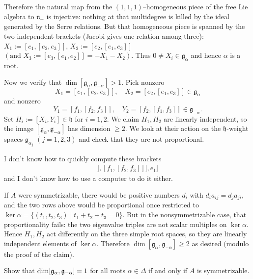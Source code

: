 \documentclass[12pt]{article}
\begin{document}
\begin{solution}[Incomplete]
    Therefore the natural map from the $(1,1,1)$–homogeneous piece of the free Lie algebra to $\mathfrak{n}_+$ is injective: nothing at that multidegree is killed by the ideal generated by the Serre relations. But that homogeneous piece is spanned by the two independent brackets (Jacobi gives one relation among three):
    $X_1:=[e_1,[e_2,e_3]]$, $X_2:=[e_2,[e_1,e_3]]$ $(\text{and }X_3:=[e_3,[e_1,e_2]]=-X_1-X_2)$. Thus $0\neq X_i\in \mathfrak{g}_{\alpha}$ and hence $\alpha$ is a root.


    Now we verify that $\dim [\mathfrak{g}_\alpha,\mathfrak{g}_{-\alpha}]>1$. Pick nonzero
    \[
        X_1=[e_1,[e_2,e_3]], \quad X_2=[e_2,[e_1,e_3]]\in \mathfrak{g}_\alpha
    \]
    and nonzero
    \[
        Y_1=[f_1,[f_2,f_3]], \quad Y_2=[f_2,[f_1,f_3]]\in \mathfrak{g}_{-\alpha}.
    \]
    Set
    $H_i:=[X_i,Y_i]\in\mathfrak{h}$ for $i=1,2$. We claim $H_1,H_2$ are linearly independent, so the image $[\mathfrak{g}_\alpha,\mathfrak{g}_{-\alpha}]$ has dimension $\geq2$. We look at their action on the $\mathfrak{h}$-weight spaces $\mathfrak{g}_{\alpha_j}$ $(j=1,2,3)$ and check that they are not proportional.

    I don't know how to quickly compute these brackets \begin{align*}
        [[[e_1,[e_2,e_3]],[f_1,[f_2,f_3]]],e_1]
    \end{align*} and I don't know how to use a computer to do it either. 

    If $A$ were symmetrizable, there would be positive numbers $d_i$ with $d_i a_{ij}=d_j a_{ji}$, and the two rows above would be proportional once restricted to $\ker\alpha=\{(t_1,t_2,t_3)\mid t_1+t_2+t_3=0\}$. But in the nonsymmetrizable case, that proportionality fails: the two eigenvalue triples are not scalar multiples on $\ker\alpha$. Hence $H_1,H_2$ act differently on the three simple root spaces, so they are linearly independent elements of $\ker\alpha$. Therefore $\dim [\mathfrak{g}_\alpha,\mathfrak{g}_{-\alpha}] \geq 2$ as desired (modulo the proof of the claim).
\end{solution}

\begin{exercise}
    Show that $\dim [\mathfrak{g}_\alpha,\mathfrak{g}_{-\alpha}] = 1$ for all roots $\alpha \in \Delta$ if and only if $A$ is symmetrizable.
\end{exercise}
\end{document}
